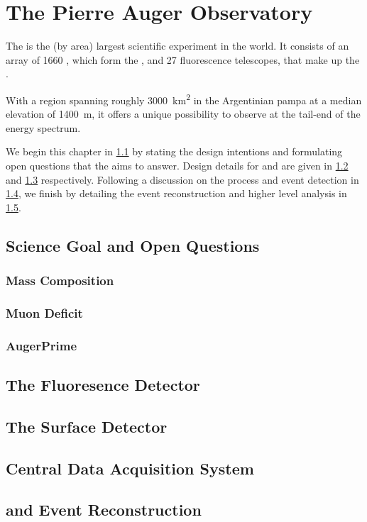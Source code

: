 
\chapter[The Pierre Auger Observatory]{The Pierre Auger Observatory}
\label{chap:pierre-auger-observatory}

The \PAO is the (by area) largest scientific experiment in the world. It 
consists of an array of 1660 \WCDs, which form the \SD, and 27 fluorescence 
telescopes, that make up the \FD.

With a region spanning roughly \SI{3000}{\kilo\meter\squared} in the Argentinian
pampa at a median elevation of \SI{1400}{\meter}, it offers a unique possibility
to observe \UHECRs at the tail-end of the \CR energy spectrum. 

We begin this chapter in \cref{sec:science-case} by stating the design 
intentions and formulating open questions that the \PAO aims to answer. Design
details for \FD and \SD are given in \cref{sec:fd} and \cref{sec:sd} 
respectively. Following a discussion on the \DAQ process and event detection in 
\cref{sec:cdas}, we finish by detailing the event reconstruction and higher 
level analysis in \cref{sec:rec}.

\section{Science Goal and Open Questions}
\label{sec:science-case}

\blindtext

\subsection{Mass Composition}

\blindtext

\subsection{Muon Deficit}

\blindtext

\subsection{AugerPrime}

\blindtext

\section{The Fluoresence Detector}
\label{sec:fd}

\blindtext

\section{The Surface Detector}
\label{sec:sd}

\blindtext

\section{Central Data Acquisition System}
\label{sec:cdas}

\blindtext

\section{\Offline and Event Reconstruction}
\label{sec:rec}

\blindtext
